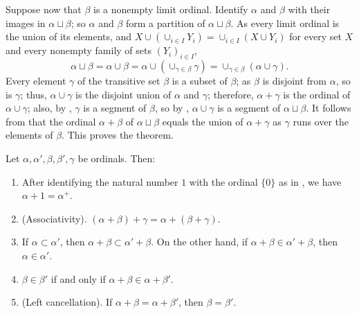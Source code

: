 \documentclass{article}
\begin{document}
Suppose now that \(\beta\) is a nonempty limit ordinal.  Identify
\(\alpha\) and \(\beta\) with their images in \(\alpha \sqcup \beta\);
so \(\alpha\) and \(\beta\) form a partition of
\(\alpha \sqcup \beta\).  As every limit ordinal is the union of its
elements, and
\(X \cup (\cup_{i \in I} Y_i) = \cup_{i \in I} (X \cup Y_i)\) for
every set \(X\) and every nonempty family of sets \((Y_i)_{i \in I}\),
\begin{displaymath}
  \alpha \sqcup \beta = \alpha \cup \beta =
  \alpha \cup (\cup_{\gamma \in \beta} \gamma) =
  \cup_{\gamma \in \beta} (\alpha \cup \gamma).
\end{displaymath}
Every element \(\gamma\) of the transitive set \(\beta\) is a subset
of \(\beta\); as \(\beta\) is disjoint from \(\alpha\), so is
\(\gamma\); thus, \(\alpha \cup \gamma\) is the disjoint union of
\(\alpha\) and \(\gamma\); therefore, \(\alpha + \gamma\) is the
ordinal of \(\alpha \cup \gamma\); also, by ,
\(\gamma\) is a segment of \(\beta\), so by ,
\(\alpha \cup \gamma\) is a segment of \(\alpha \sqcup \beta\).  It
follows from  that the ordinal \(\alpha + \beta\)
of \(\alpha \sqcup \beta\) equals the union of \(\alpha + \gamma\) as
\(\gamma\) runs over the elements of \(\beta\).  This proves the
theorem.

\begin{theorem}
  \label{thm:506mms8z}
  Let \(\alpha, \alpha', \beta, \beta', \gamma\) be ordinals.  Then:
  \begin{enumerate}
  \item After identifying the natural number \(1\) with the ordinal
    \(\{0\}\) as in , we have
    \(\alpha + 1 = \alpha^+\).
  \item (Associativity).
    \((\alpha + \beta) + \gamma = \alpha + (\beta + \gamma)\).
  \item \label{item:n6u00qz2} If \(\alpha \subset \alpha'\), then
    \(\alpha + \beta \subset \alpha' + \beta\).  On the other hand, if
    \(\alpha + \beta \in \alpha' + \beta\), then
    \(\alpha \in \alpha'\).
  \item \label{item:bhc8ls0b} \(\beta \in \beta'\) if and only if
    \(\alpha + \beta \in \alpha + \beta'\).
  \item (Left cancellation).  If \(\alpha + \beta = \alpha + \beta'\),
    then \(\beta = \beta'\).
  \end{enumerate}
\end{theorem}
\end{document}
